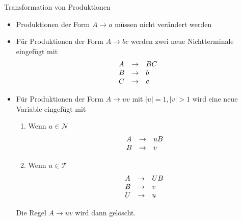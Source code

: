 \documentclass[]{beamer}
\begin{document}
\begin{frame}[squeeze]{}
  \begin{block}{Transformation von Produktionen}
    \begin{itemize}
      \item Produktionen der Form $A \to a$ müssen nicht verändert werden
      \pause
      \item Für Produktionen der Form $A \to bc$ werden zwei neue Nichtterminale eingefügt mit
            \[\begin{array}{l c l}
              A & \to & BC \\
              B & \to & b \\
              C & \to & c \\
            \end{array}\]
      \pause
      \item Für Produktionen der Form $A \to uv$ mit $|u| = 1, |v| > 1$ wird eine neue Variable eingefügt mit
            \begin{enumerate}
              \item Wenn $u \in \mathcal{N}$
                    \vspace*{-0.25em}
                    \[\begin{array}{l c l}
                      A & \to & uB \\
                      B & \to & v \\
                    \end{array}\]
              \item Wenn $u \in \mathcal{T}$
                    \vspace*{-0.25em}
                    \[\begin{array}{l c l}
                      A & \to & UB \\
                      B & \to & v \\
                      U & \to & u \\
                    \end{array}\]
            \end{enumerate}
            Die Regel $A \to uv$ wird dann gelöscht.
    \end{itemize}
  \end{block}
\end{frame}
\end{document}
